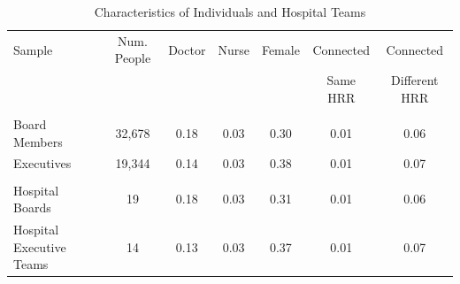 \begin{table}[ht!]

\caption{Characteristics of Individuals and Hospital Teams\label{tab:people}}
\centering
\begin{tabular}[t]{lcccccc}
\toprule
Sample & Num. People & Doctor & Nurse & Female & Connected & Connected\\
 & & & & & Same HRR & Different HRR\\
\midrule
\addlinespace[0.3em]
\multicolumn{7}{l}{\textbf{Individuals}}\\
\hspace{1em}Board Members & 32,678 & 0.18 & 0.03 & 0.30 & 0.01 & 0.06\\
\hspace{1em}Executives & 19,344 & 0.14 & 0.03 & 0.38 & 0.01 & 0.07\\
\addlinespace[0.3em]
\multicolumn{7}{l}{\textbf{Hospital Teams}}\\
\hspace{1em}Hospital Boards & 19 & 0.18 & 0.03 & 0.31 & 0.01 & 0.06\\
\hspace{1em}Hospital Executive Teams & 14 & 0.13 & 0.03 & 0.37 & 0.01 & 0.07\\
\bottomrule
\end{tabular}
\end{table}
